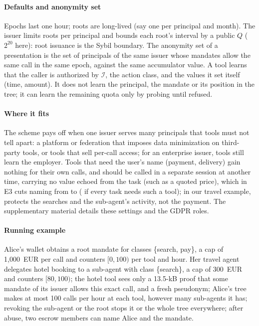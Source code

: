 \paragraph*{Defaults and anonymity set} Epochs last one hour; roots are long-lived (say one per principal and month). The issuer limits roots per principal and bounds each root's interval by a public $Q$ ($2^{20}$ here): root issuance is the Sybil boundary. The anonymity set of a presentation is the set of principals of the same issuer whose mandates allow the same call in the same epoch, against the same accumulator value. A tool learns that the caller is authorized by $\mathcal{I}$, the action class, and the values it set itself (time, amount). It does not learn the principal, the mandate or its position in the tree; it can learn the remaining quota only by probing until refused.

\paragraph*{Where it fits} The scheme pays off when one issuer serves many principals that tools must not tell apart: a platform or federation that imposes data minimization on third-party tools, or tools that sell per-call access; for an enterprise issuer, tools still learn the employer. Tools that need the user's name (payment, delivery) gain nothing for their own calls, and should be called in a separate session at another time, carrying no value echoed from the task (such as a quoted price), which in E3 cuts naming from \NameMM{} to \NameDecHourFree{} (\NameDecHourEvery{} if every task needs such a tool); in our travel example, \sys{} protects the searches and the sub-agent's activity, not the payment. The supplementary material details these settings and the GDPR roles.

\paragraph*{Running example} Alice's wallet obtains a root mandate for classes \{search, pay\}, a cap of 1{,}000~EUR per call and counters $[0,100)$ per tool and hour.
Her travel agent delegates hotel booking to a sub-agent with class \{search\}, a cap of 300~EUR and counters $[80,100)$; the hotel tool sees only a 13.5-kB proof that some mandate of its issuer allows this exact call, and a fresh pseudonym; Alice's tree makes at most 100 calls per hour at each tool, however many sub-agents it has; revoking the sub-agent or the root stops it or the whole tree everywhere; after abuse, two escrow members can name Alice and the mandate.

